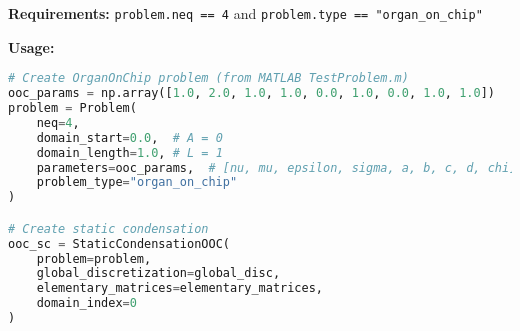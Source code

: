 \textbf{Requirements:} \texttt{problem.neq == 4} and \texttt{problem.type == "organ\_on\_chip"}

\textbf{Usage:}
\begin{lstlisting}[language=Python, caption=OrganOnChip Constructor Usage]
# Create OrganOnChip problem (from MATLAB TestProblem.m)
ooc_params = np.array([1.0, 2.0, 1.0, 1.0, 0.0, 1.0, 0.0, 1.0, 1.0])
problem = Problem(
    neq=4,
    domain_start=0.0,  # A = 0
    domain_length=1.0, # L = 1
    parameters=ooc_params,  # [nu, mu, epsilon, sigma, a, b, c, d, chi]
    problem_type="organ_on_chip"
)

# Create static condensation
ooc_sc = StaticCondensationOOC(
    problem=problem,
    global_discretization=global_disc,
    elementary_matrices=elementary_matrices,
    domain_index=0
)
\end{lstlisting}

